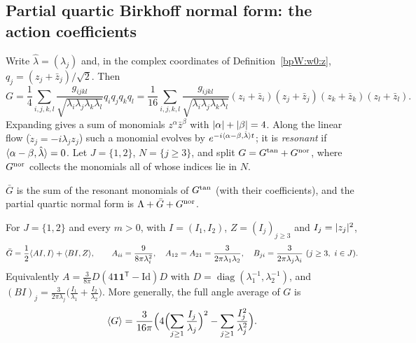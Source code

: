 \subsection{Partial quartic Birkhoff normal form: the action coefficients}\label{bpW:w0n:birkhoff}

Write $\hat\lambda=(\lambda_j)$ and, in the complex coordinates of Definition~\ref{bpW:w0:z},
$q_j=(z_j+\bar z_j)/\sqrt2$. Then
\begin{equation}\label{bpW:w0n:Gz}
G=\frac14\sum_{i,j,k,l}\frac{g_{ijkl}}{\sqrt{\lambda_i\lambda_j\lambda_k\lambda_l}}q_iq_jq_kq_l
=\frac1{16}\sum_{i,j,k,l}\frac{g_{ijkl}}{\sqrt{\lambda_i\lambda_j\lambda_k\lambda_l}}
(z_i+\bar z_i)(z_j+\bar z_j)(z_k+\bar z_k)(z_l+\bar z_l).
\end{equation}
Expanding gives a sum of monomials $z^\alpha\bar z^\beta$ with $\lvert \alpha\rvert+\lvert \beta\rvert=4$. Along the linear flow
($\dot z_j=-i\lambda_jz_j$) such a monomial evolves by $e^{-i\langle \alpha-\beta,\hat\lambda\rangle t}$; it is
\emph{resonant} if $\langle \alpha-\beta,\hat\lambda\rangle=0$. Let $J=\{1,2\}$, $N=\{j\ge3\}$, and split
$G=G^{\rm tan}+G^{\rm nor}$, where $G^{\rm nor}$ collects the monomials all of whose indices lie in $N$.

\begin{definition}\label{bpW:w0n:Qdef}
$\bar G$ is the sum of the resonant monomials of $G^{\rm tan}$ (with their coefficients), and the partial quartic
normal form is $\Lambda+\bar G+G^{\rm nor}$.
\end{definition}

\begin{theorem}\label{bpW:w0n:AB}
For $J=\{1,2\}$ and every $m>0$, with $I=(I_1,I_2)$, $Z=(I_j)_{j\ge3}$ and $I_j=\lvert z_j\rvert^2$,
\[\bar G=\frac12\langle AI,I\rangle+\langle BI,Z\rangle,\qquad
A_{ii}=\frac{9}{8\pi\lambda_i^2},\quad A_{12}=A_{21}=\frac{3}{2\pi\lambda_1\lambda_2},\quad
B_{ji}=\frac{3}{2\pi\lambda_j\lambda_i}\ (j\ge3,\ i\in J).\]
Equivalently $A=\frac{3}{8\pi}D(4\mathbf 1\mathbf 1^{\mathsf T}-\mathrm{Id})D$ with $D=\operatorname{diag}(\lambda_1^{-1},\lambda_2^{-1})$,
and $(BI)_j=\frac{3}{2\pi\lambda_j}\bigl(\frac{I_1}{\lambda_1}+\frac{I_2}{\lambda_2}\bigr)$. More generally, the full
angle average of $G$ is
\begin{equation}\label{bpW:w0n:avgG}
\langle G\rangle=\frac{3}{16\pi}\Bigl(4\Bigl(\sum_{j\ge1}\frac{I_j}{\lambda_j}\Bigr)^2-\sum_{j\ge1}\frac{I_j^2}{\lambda_j^2}\Bigr).
\end{equation}
\end{theorem}

